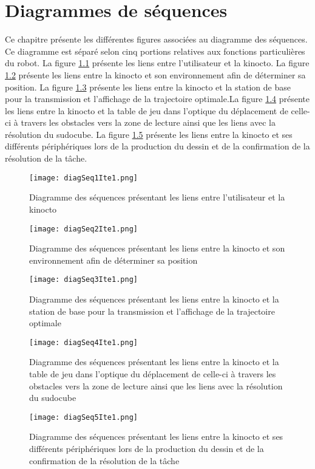 


\chapter{Diagrammes de séquences}
\label{s:sequences}
Ce chapitre présente les différentes figures associées au diagramme des séquences. Ce diagramme est séparé selon cinq portions relatives aux fonctions particulières du robot. La figure \ref{fig:diagSeq1Ite1} présente les liens entre l'utilisateur et la kinocto. La figure \ref{diagSeq2Ite1} présente les liens entre la kinocto et son environnement afin de déterminer sa position. La figure \ref{diagSeq3Ite1} présente les liens entre la kinocto et la station de base pour la transmission et l'affichage de la trajectoire optimale.La figure \ref{diagSeq4Ite1} présente les liens entre la kinocto et la table de jeu dans l'optique du déplacement de celle-ci à travers les obstacles vers la zone de lecture ainsi que les liens avec la résolution du sudocube. La figure \ref{diagSeq5Ite1} présente les liens entre la kinocto et ses différents périphériques lors de la production du dessin et de la confirmation de la résolution de la tâche.
\begin{figure}[htb]
\centering
\texttt{[image: diagSeq1Ite1.png]}
\caption{Diagramme des séquences présentant les liens entre l'utilisateur et la kinocto}
\label{fig:diagSeq1Ite1} 
\end{figure}
\begin{figure}[htb]
\texttt{[image: diagSeq2Ite1.png]}
\caption{Diagramme des séquences présentant les liens entre la kinocto et son environnement afin de déterminer sa position}
\label{diagSeq2Ite1}
\end{figure}
\begin{figure}[htb]
\texttt{[image: diagSeq3Ite1.png]}
\caption{Diagramme des séquences présentant les liens entre la kinocto et la station de base pour la transmission et l'affichage de la trajectoire optimale}
\label{diagSeq3Ite1}
\end{figure}
\begin{figure}[htb]
\texttt{[image: diagSeq4Ite1.png]}
\caption{Diagramme des séquences présentant les liens entre la kinocto et la table de jeu dans l'optique du déplacement de celle-ci à travers les obstacles vers la zone de lecture ainsi que les liens avec la résolution du sudocube}
\label{diagSeq4Ite1}
\end{figure}
\begin{figure}[htb]
\texttt{[image: diagSeq5Ite1.png]}
\caption{Diagramme des séquences présentant les liens entre la kinocto et ses différents périphériques lors de la production du dessin et de la confirmation de la résolution de la tâche}
\label{diagSeq5Ite1}
\end{figure}
